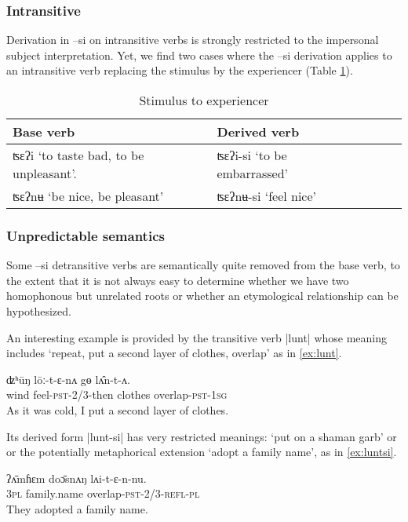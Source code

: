 \documentclass[twoside,a4paper,11pt]{article}
\newcommand{\ipa}[1]{{\phon#1}}
\begin{document}
\subsubsection{Intransitive} 
Derivation in \ipa{--si}  on intransitive verbs is strongly restricted to the impersonal subject interpretation. Yet, we find two cases where the \ipa{--si} derivation applies to an intransitive verb replacing the stimulus by the experiencer (Table \ref{tab:stimulus}).

\begin{table}[H]
 \centering 
\caption{Stimulus to experiencer  } \label{tab:stimulus}
\begin{tabular}{lllll}
\toprule
Base verb & Derived verb \\
\midrule
\ipa{ʦɛʔi} `to taste bad, to be unpleasant'.    & \ipa{ʦɛʔi-si} `to be embarrassed'  \\
\ipa{ʦɛʔnʉ} `be nice, be pleasant' &   \ipa{ʦɛʔnʉ-si} `feel nice' \\
\bottomrule
\end{tabular}
\end{table}
 
\subsubsection{Unpredictable semantics}

Some \ipa{--si} detransitive verbs are semantically quite removed from the base verb, to the extent that it is not always easy to determine whether we have two homophonous but unrelated roots or whether an etymological relationship can be hypothesized.

An interesting example is provided by the transitive verb |\ipa{lunt}| whose meaning includes `repeat, put a second layer of clothes, overlap' as in \ref{ex:lunt}.
\begin{exe}
\ex \label{ex:lunt}
\gll 
\ipa{ʣʰūŋ}  	\ipa{lōː-t-ɛ-nʌ}  	\ipa{gɵ}  	\ipa{lʌ̂n-t-ʌ.}  \\
wind feel-\textsc{pst-2/3}-then clothes overlap-\textsc{pst-1sg} \\ 
\glt As it was cold, I put a second layer of clothes.
\end{exe}

Its derived form |\ipa{lunt-si}| has very restricted meanings: `put on a shaman garb' or or the potentially metaphorical extension `adopt a family name', as in \ref{ex:luntsi}.

\begin{exe}
\ex \label{ex:luntsi}
\gll 
\ipa{ʔʌ̄mɦɛm}  	\ipa{doɔ̄snʌŋ}  	\ipa{lʌi-t-ɛ-n-nu.}  \\
\textsc{3pl} family.name overlap-\textsc{pst-2/3-refl-pl} \\
\glt They adopted a family name.
\end{exe}
\end{document}
